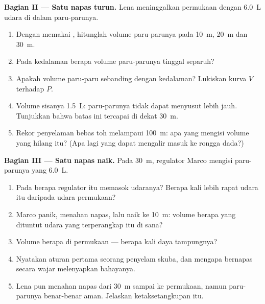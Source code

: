 \begin{problem}
\medskip
\noindent\textbf{Bagian II --- Satu napas turun.}
Lena meninggalkan permukaan dengan \qty{6.0}{L} udara di dalam
paru-parunya.
\begin{enumerate}[resume]
  \item Dengan  memakai , hitunglah volume
        paru-parunya pada \qty{10}{m}, \qty{20}{m} dan \qty{30}{m}.
  \item Pada kedalaman berapa volume paru-parunya tinggal separuh?
  \item Apakah volume paru-paru sebanding dengan kedalaman? Lukiskan
        kurva $V$ terhadap  $P$.
  \item Volume sisanya \qty{1.5}{L}: paru-parunya tidak dapat menyusut
        lebih jauh. Tunjukkan bahwa batas ini tercapai di dekat
        \qty{30}{m}.
  \item Rekor penyelaman bebas toh melampaui \qty{100}{m}: apa yang
        mengisi volume yang hilang itu? (Apa lagi yang dapat mengalir
        masuk ke rongga dada?)
\end{enumerate}

\medskip
\noindent\textbf{Bagian III --- Satu napas naik.}
Pada \qty{30}{m}, regulator Marco mengisi paru-parunya yang
\qty{6.0}{L}.
\begin{enumerate}[resume]
  \item Pada  berapa regulator itu memasok udaranya? Berapa kali
        lebih rapat udara itu daripada udara permukaan?
  \item Marco panik, menahan napas, lalu naik ke \qty{10}{m}: volume
        berapa yang dituntut udara yang terperangkap itu di sana?
  \item Volume berapa di permukaan --- berapa kali daya tampungnya?
  \item Nyatakan aturan pertama seorang penyelam skuba, dan mengapa
        bernapas secara wajar melenyapkan bahayanya.
  \item Lena pun menahan napas dari \qty{30}{m} sampai ke permukaan,
        namun paru-parunya benar-benar aman. Jelaskan ketaksetangkupan
        itu.
\end{enumerate}


\end{problem}
